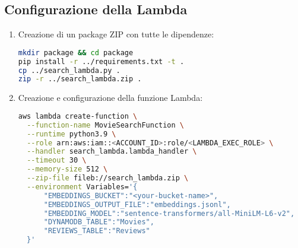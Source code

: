 \documentclass[11pt,a4paper]{article}
\begin{document}
\subsection{Configurazione della Lambda}
\begin{enumerate}
  \item Creazione di un package ZIP con tutte le dipendenze:
\begin{lstlisting}[language=bash]
mkdir package && cd package
pip install -r ../requirements.txt -t .
cp ../search_lambda.py .
zip -r ../search_lambda.zip .
\end{lstlisting}

  \item Creazione e configurazione della funzione Lambda:
\begin{lstlisting}[language=bash]
aws lambda create-function \
  --function-name MovieSearchFunction \
  --runtime python3.9 \
  --role arn:aws:iam::<ACCOUNT_ID>:role/<LAMBDA_EXEC_ROLE> \
  --handler search_lambda.lambda_handler \
  --timeout 30 \
  --memory-size 512 \
  --zip-file fileb://search_lambda.zip \
  --environment Variables='{
      "EMBEDDINGS_BUCKET":"<your-bucket-name>",
      "EMBEDDINGS_OUTPUT_FILE":"embeddings.jsonl",
      "EMBEDDING_MODEL":"sentence-transformers/all-MiniLM-L6-v2", 
      "DYNAMODB_TABLE":"Movies",
      "REVIEWS_TABLE":"Reviews"
  }'
\end{lstlisting}
\end{enumerate}
\end{document}
